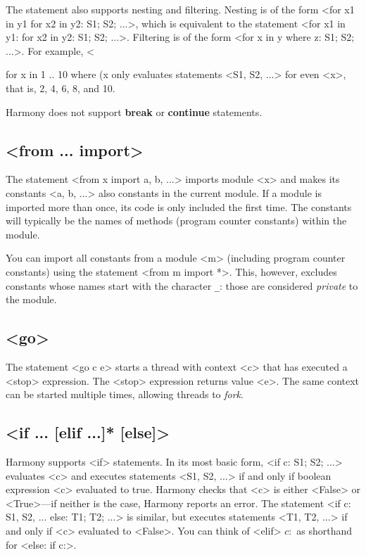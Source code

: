\documentclass{report}
\begin{document}
The statement also supports nesting and filtering.
Nesting is of the form
<{for x1 in y1 for x2 in y2: S1; S2; ...}>,
which is equivalent to the statement
<{for x1 in y1: for x2 in y2: S1; S2; ...}>.
Filtering is of the form
<{for x in y where z: S1; S2; ...}>.
For example,
<{for x in 1 .. 10 where (x %
only evaluates statements <{S1, S2, ...}> for even <{x}>,
that is, 2, 4, 6, 8, and 10.

Harmony does not support \textbf{break} or \textbf{continue} statements.

\subsection*{<{from ... import}>}

The statement <{from x import a, b, ...}>
imports module <{x}> and makes its constants <{a, b, ...}> also constants
in the current module.  If a module is imported more than once, its code
is only included the first time.  The constants will typically be the
names of methods (program counter constants) within the module.

You can import all constants from a module <{m}>
(including program counter constants) using the statement
<{from m import *}>.
This, however, excludes constants whose names start with the character
\texttt{\_}: those are considered \emph{private} to the module.

\subsection*{<{go}>}

The statement <{go c e}> starts a thread with context <{c}> that
has executed a <{stop}> expression.  The <{stop}> expression
returns value <{e}>.
The same context can be started multiple times, allowing threads to
\emph{fork}.

\subsection*{<{if ... [elif ...]* [else]}>}

Harmony supports <{if}> statements.
In its most basic form, <{if c: S1; S2; ...}> evaluates <{c}>
and executes statements <{S1, S2, ...}> if and only if boolean expression
<{c}> evaluated to true.
Harmony checks that <{c}> is either <{False}> or <{True}>---if neither
is the case, Harmony reports an error.
The statement <{if c: S1, S2, ... else: T1; T2; ...}>
is similar, but executes statements <{T1, T2, ...}>
if and only if <{c}> evaluated to <{False}>.
You can think of <{elif}> $c:$ as shorthand for <{else: if c:}>.

}
\end{document}
